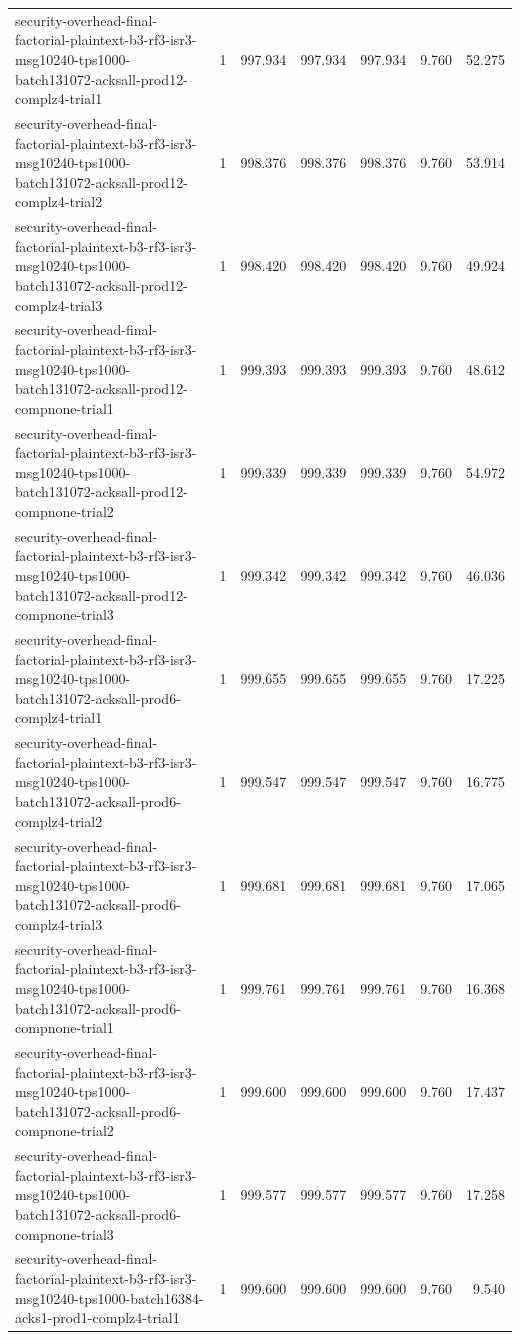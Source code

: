 \begin{tabular}{lrrrrrr}
security-overhead-final-factorial-plaintext-b3-rf3-isr3-msg10240-tps1000-batch131072-acksall-prod12-complz4-trial1 & 1 & 997.934 & 997.934 & 997.934 & 9.760 & 52.275 \\
security-overhead-final-factorial-plaintext-b3-rf3-isr3-msg10240-tps1000-batch131072-acksall-prod12-complz4-trial2 & 1 & 998.376 & 998.376 & 998.376 & 9.760 & 53.914 \\
security-overhead-final-factorial-plaintext-b3-rf3-isr3-msg10240-tps1000-batch131072-acksall-prod12-complz4-trial3 & 1 & 998.420 & 998.420 & 998.420 & 9.760 & 49.924 \\
security-overhead-final-factorial-plaintext-b3-rf3-isr3-msg10240-tps1000-batch131072-acksall-prod12-compnone-trial1 & 1 & 999.393 & 999.393 & 999.393 & 9.760 & 48.612 \\
security-overhead-final-factorial-plaintext-b3-rf3-isr3-msg10240-tps1000-batch131072-acksall-prod12-compnone-trial2 & 1 & 999.339 & 999.339 & 999.339 & 9.760 & 54.972 \\
security-overhead-final-factorial-plaintext-b3-rf3-isr3-msg10240-tps1000-batch131072-acksall-prod12-compnone-trial3 & 1 & 999.342 & 999.342 & 999.342 & 9.760 & 46.036 \\
security-overhead-final-factorial-plaintext-b3-rf3-isr3-msg10240-tps1000-batch131072-acksall-prod6-complz4-trial1 & 1 & 999.655 & 999.655 & 999.655 & 9.760 & 17.225 \\
security-overhead-final-factorial-plaintext-b3-rf3-isr3-msg10240-tps1000-batch131072-acksall-prod6-complz4-trial2 & 1 & 999.547 & 999.547 & 999.547 & 9.760 & 16.775 \\
security-overhead-final-factorial-plaintext-b3-rf3-isr3-msg10240-tps1000-batch131072-acksall-prod6-complz4-trial3 & 1 & 999.681 & 999.681 & 999.681 & 9.760 & 17.065 \\
security-overhead-final-factorial-plaintext-b3-rf3-isr3-msg10240-tps1000-batch131072-acksall-prod6-compnone-trial1 & 1 & 999.761 & 999.761 & 999.761 & 9.760 & 16.368 \\
security-overhead-final-factorial-plaintext-b3-rf3-isr3-msg10240-tps1000-batch131072-acksall-prod6-compnone-trial2 & 1 & 999.600 & 999.600 & 999.600 & 9.760 & 17.437 \\
security-overhead-final-factorial-plaintext-b3-rf3-isr3-msg10240-tps1000-batch131072-acksall-prod6-compnone-trial3 & 1 & 999.577 & 999.577 & 999.577 & 9.760 & 17.258 \\
security-overhead-final-factorial-plaintext-b3-rf3-isr3-msg10240-tps1000-batch16384-acks1-prod1-complz4-trial1 & 1 & 999.600 & 999.600 & 999.600 & 9.760 & 9.540 \\

\end{tabular}
